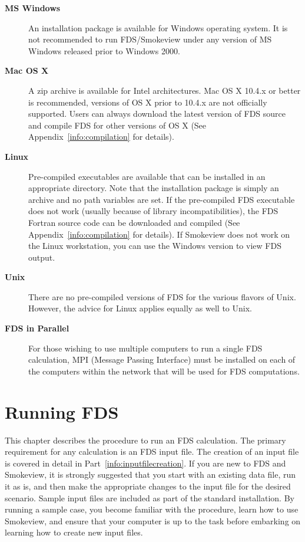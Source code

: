 \documentclass[11pt]{book}
\begin{document}
\begin{description}
\item[{\bf MS Windows}]
An installation package is available for Windows operating system.
It is not recommended to run FDS/Smokeview under any version of MS Windows
released prior to Windows 2000.

\item[{\bf Mac OS X}]
A zip archive is available for Intel architectures.
Mac OS X 10.4.x or better is recommended, versions of OS X prior to 10.4.x are not
officially supported. Users can always download the latest version of FDS source and
compile FDS for other versions of OS X (See Appendix~\ref{info:compilation} for details).

\item[{\bf Linux}]
Pre-compiled executables are available that can be installed in an appropriate directory. Note that
the installation package is simply an archive and no path variables are set. If the pre-compiled
FDS executable does not work (usually because of library incompatibilities),
the FDS Fortran source code can be downloaded and compiled (See Appendix~\ref{info:compilation} for details). If Smokeview
does not work on the Linux workstation, you can use the Windows version to view FDS output.

\item[{\bf Unix}]
There are no pre-compiled versions of FDS for the various flavors of Unix. However, the advice for Linux applies
equally as well to Unix.

\item[{\bf FDS in Parallel}] For those wishing to use multiple computers to run a single FDS calculation,
MPI (Message Passing Interface) must be installed on each of the
computers within the network that will be used for FDS computations.
\end{description}



\chapter{Running FDS}
\label{info:runningFDS}

This chapter describes the procedure to run an FDS calculation.
The primary requirement for any calculation is an FDS input file. The creation of an
input file is covered in detail in Part~\ref{info:inputfilecreation}.
If you are new to FDS and Smokeview, it is strongly suggested that you start with an existing data file, run it as is,
and then make the appropriate changes to the input file for the
desired scenario. Sample input files are included as part of the standard installation.
By running a sample case, you become familiar with the procedure, learn how to use Smokeview, and
ensure that your computer is up to the task before embarking on
learning how to create new input files.
\end{document}
